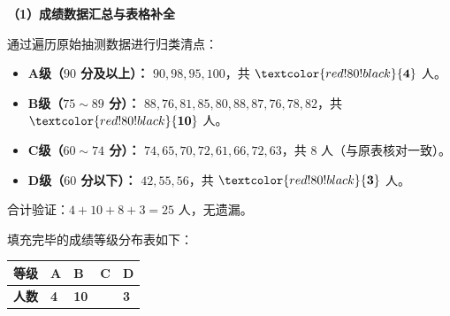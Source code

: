 \textbf{（1）成绩数据汇总与表格补全}

通过遍历原始抽测数据进行归类清点：
\begin{itemize}
    \item \textbf{A级（$90$ 分及以上）：} $90, 98, 95, 100$，共 $\textcolor{red!80!black}{\mathbf{4}}$ 人。
    \item \textbf{B级（$75\sim 89$ 分）：} $88, 76, 81, 85, 80, 88, 87, 76, 78, 82$，共 $\textcolor{red!80!black}{\mathbf{10}}$ 人。
    \item \textbf{C级（$60\sim 74$ 分）：} $74, 65, 70, 72, 61, 66, 72, 63$，共 \textbf{$8$} 人（与原表核对一致）。
    \item \textbf{D级（$60$ 分以下）：} $42, 55, 56$，共 $\textcolor{red!80!black}{\mathbf{3}}$ 人。
\end{itemize}
合计验证：$4 + 10 + 8 + 3 = 25$ 人，无遗漏。

填充完毕的成绩等级分布表如下：
\begin{center}
\renewcommand{\arraystretch}{1.8}
\setlength{\arrayrulewidth}{0.8pt}
\begin{tabular}{|>{\centering\arraybackslash}p{2cm}|>{\centering\arraybackslash}p{2cm}|>{\centering\arraybackslash}p{2cm}|>{\centering\arraybackslash}p{2cm}|>{\centering\arraybackslash}p{2cm}|}
\hline
\textbf{等级} & \textbf{A} & \textbf{B} & \textbf{C} & \textbf{D} \\
\hline
\textbf{人数} & \textcolor{red!80!black}{\textbf{4}} & \textcolor{red!80!black}{\textbf{10}} & 8 & \textcolor{red!80!black}{\textbf{3}} \\
\hline
\end{tabular}
\end{center}

